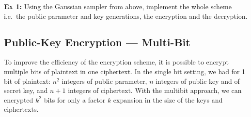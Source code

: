 \documentclass[10pt,a4paper,nobib]{tufte-handout}
\begin{document}
%
%
\textbf{Ex 1:} Using the Gaussian sampler from above, implement the whole scheme i.e.~the public parameter and key generations, the encryption and the decryption.

\subsection{Public-Key Encryption --- Multi-Bit}

To improve the efficiency of the encryption scheme, it is possible to encrypt multiple bits of plaintext in one ciphertext. In the single bit setting, we had for 1 bit of plaintext: $n^2$ integers of public parameter, $n$ integers of public key and of secret key, and $n+1$ integers of ciphertext. With the multibit approach, we can encrypted $k^2$ bits for only a factor $k$ expansion in the size of the keys and ciphertexts.
\end{document}
